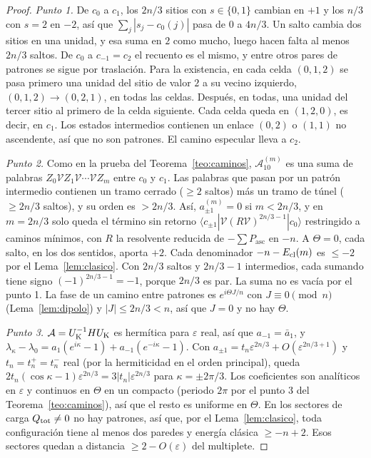 \documentclass[11pt,a4paper]{article}
\theoremstyle{definition}
\theoremstyle{remark}
\newcommand{\ket}[1]{|#1\rangle}
\newcommand{\bra}[1]{\langle #1|}
\newcommand{\Pasc}{P_{\mathrm{asc}}}
\newcommand{\eps}{\varepsilon}
\begin{document}
\begin{proof}
\emph{Punto 1.} De $c_0$ a $c_1$, los $2n/3$ sitios con $s\in\{0,1\}$ cambian en $+1$ y los $n/3$ con $s=2$
en $-2$, así que $\sum_j|s_j-c_0(j)|$ pasa de $0$ a $4n/3$. Un salto cambia dos sitios en una unidad, y esa
suma en $2$ como mucho, luego hacen falta al menos $2n/3$ saltos. De $c_0$ a $c_{-1}=c_2$ el recuento es el
mismo, y entre otros pares de patrones se sigue por traslación. Para la existencia, en cada celda
$(0,1,2)$ se pasa primero una unidad del sitio de valor $2$ a su vecino izquierdo, $(0,1,2)\to(0,2,1)$,
en todas las celdas. Después, en todas, una unidad del tercer sitio al primero de la celda siguiente.
Cada celda queda en $(1,2,0)$, es decir, en $c_1$. Los estados intermedios contienen un enlace $(0,2)$ o
$(1,1)$ no ascendente, así que no son patrones. El camino especular lleva a $c_2$.

\emph{Punto 2.} Como en la prueba del Teorema~\ref{teo:caminos}, $\mathcal A^{(m)}_{10}$ es una suma de palabras
$Z_0\mathcal VZ_1\mathcal V\cdots\mathcal VZ_m$ entre $c_0$ y $c_1$. Las palabras que pasan por un patrón intermedio contienen un
tramo cerrado ($\ge2$ saltos) más un tramo de túnel ($\ge2n/3$ saltos), y su orden es $>2n/3$. Así,
$a_{\pm1}^{(m)}=0$ si $m<2n/3$, y en $m=2n/3$ solo queda el término sin retorno
$\bra{c_{\pm1}}\mathcal V(R\mathcal V)^{2n/3-1}\ket{c_0}$ restringido a caminos mínimos, con $R$ la resolvente reducida de
$-\sum\Pasc$ en $-n$. A $\Theta=0$, cada salto, en los dos sentidos, aporta $+2$. Cada denominador
$-n-E_{\rm cl}(m)$ es $\le-2$ por el Lema~\ref{lem:clasico}. Con $2n/3$ saltos y $2n/3-1$ intermedios,
cada sumando tiene signo $(-1)^{2n/3-1}=-1$, porque $2n/3$ es par. La suma no es vacía por el punto 1. La
fase de un camino entre patrones es $e^{i\Theta J/n}$ con $J\equiv0\pmod n$ (Lema~\ref{lem:dipolo}) y
$|J|\le2n/3<n$, así que $J=0$ y no hay $\Theta$.

\emph{Punto 3.} $\mathcal A=U_{\rm K}^{-1}HU_{\rm K}$ es hermítica para $\eps$ real, así que $a_{-1}=\bar a_1$, y
$\lambda_\kappa-\lambda_0=a_1(e^{i\kappa}-1)+a_{-1}(e^{-i\kappa}-1)$. Con $a_{\pm1}=t_n\eps^{2n/3}+O(\eps^{2n/3+1})$ y
$t_n=t_n^+=t_n^-$ real (por la hermiticidad en el orden principal), queda
$2t_n(\cos\kappa-1)\eps^{2n/3}=3|t_n|\eps^{2n/3}$ para $\kappa=\pm2\pi/3$. Los coeficientes son analíticos en $\eps$ y
continuos en $\Theta$ en un compacto (periodo $2\pi$ por el punto 3 del Teorema~\ref{teo:caminos}), así que
el resto es uniforme en $\Theta$. En los sectores de carga $Q_{\rm tot}\ne0$ no hay patrones, así que, por el
Lema~\ref{lem:clasico}, toda configuración tiene al menos dos paredes y energía clásica $\ge-n+2$. Esos
sectores quedan a distancia $\ge2-O(\eps)$ del multiplete.
\end{proof}
\end{document}
